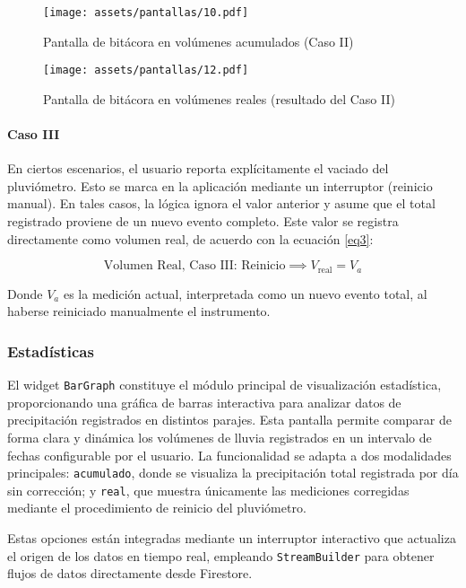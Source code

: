 \begin{figure}[h!]
\centering
\texttt{[image: assets/pantallas/10.pdf]}
\caption{Pantalla de bitácora en volúmenes acumulados (Caso II)}
\label{pantallas10}
\end{figure}

\begin{figure}[h!]
\centering
\texttt{[image: assets/pantallas/12.pdf]}
\caption{Pantalla de bitácora en volúmenes reales (resultado del Caso II)}
\label{pantallas12}
\end{figure}


\paragraph{Caso III}

En ciertos escenarios, el usuario reporta explícitamente el vaciado del pluviómetro. Esto se marca en la aplicación mediante un interruptor (reinicio manual). En tales casos, la lógica ignora el valor anterior y asume que el total registrado proviene de un nuevo evento completo. Este valor se registra directamente como volumen real, de acuerdo con la ecuación \ref{eq3}:

\begin{equation}
\text{Volumen Real, Caso III: Reinicio} \implies V_{\text{real}} = V_{a}
\label{eq3}
\end{equation}

Donde $V_{a}$ es la medición actual, interpretada como un nuevo evento total, al haberse reiniciado manualmente el instrumento.

\newpage
\subsubsection*{Estadísticas} 

El widget \texttt{BarGraph} constituye el módulo principal de visualización estadística, proporcionando una gráfica de barras interactiva para analizar datos de precipitación registrados en distintos parajes. Esta pantalla permite comparar de forma clara y dinámica los volúmenes de lluvia registrados en un intervalo de fechas configurable por el usuario. La funcionalidad se adapta a dos modalidades principales: \texttt{acumulado}, donde se visualiza la precipitación total registrada por día sin corrección; y \texttt{real}, que muestra únicamente las mediciones corregidas mediante el procedimiento de reinicio del pluviómetro. 

Estas opciones están integradas mediante un interruptor interactivo que actualiza el origen de los datos en tiempo real, empleando \texttt{StreamBuilder} para obtener flujos de datos directamente desde Firestore.

